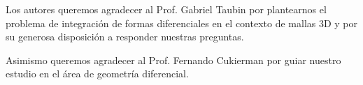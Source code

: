 \documentclass[conference,compsoc,a4paper]{IEEEtran}
\begin{document}
Los autores queremos agradecer al Prof. Gabriel Taubin por plantearnos 
el problema de integración de formas diferenciales en el contexto de 
mallas 3D y por su generosa disposición a responder nuestras preguntas.

\bigskip

Asimismo queremos agradecer al Prof. Fernando Cukierman por guiar 
nuestro estudio en el área de geometría diferencial.




%
%
%

\renewcommand\refname{Referencias}
\end{document}

